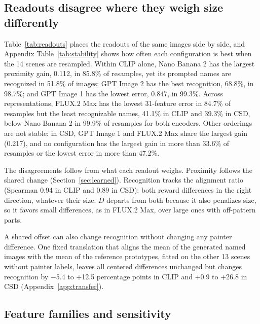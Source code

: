\documentclass[10pt]{article}
\begin{document}
\subsection{Readouts disagree where they weigh size differently}\label{sec:readouts}

Table~\ref{tab:readouts} places the readouts of the same images side by side, and Appendix
Table~\ref{tab:stability} shows how often each configuration is best when the 14 scenes are
resampled. Within CLIP alone, Nano Banana 2 has the largest proximity gain, 0.112, in 85.8\% of
resamples, yet its prompted names are recognized in 51.8\% of images; GPT Image 2 has the best
recognition, 68.8\%, in 98.7\%; and GPT Image 1 has the lowest error, 0.847, in 99.3\%. Across
representations, FLUX.2 Max has the lowest 31-feature error in 84.7\% of resamples but the least
recognizable names, 41.1\% in CLIP and 39.3\% in CSD, below Nano Banana 2 in 99.9\% of resamples for
both encoders. Other orderings are not stable: in CSD, GPT Image 1 and FLUX.2 Max share the largest
gain (0.217), and no configuration has the largest gain in more than 33.6\% of resamples or the
lowest error in more than 47.2\%.

The disagreements follow from what each readout weighs. Proximity follows the shared change
(Section~\ref{sec:learned}). Recognition tracks the alignment ratio (Spearman 0.94 in CLIP and 0.89
in CSD): both reward differences in the right direction, whatever their size. $D$ departs from both
because it also penalizes size, so it favors small differences, as in FLUX.2 Max, over large ones
with off-pattern parts.

A shared offset can also change recognition without changing any painter difference. One fixed
translation that aligns the mean of the generated named images with the mean of the reference
prototypes, fitted on the other 13 scenes without painter labels, leaves all centered differences
unchanged but changes recognition by $-$5.4 to +12.5 percentage points in CLIP and +0.9 to +26.8 in
CSD (Appendix~\ref{app:transfer}).

\subsection{Feature families and sensitivity}\label{sec:sensitivity}
\end{document}
